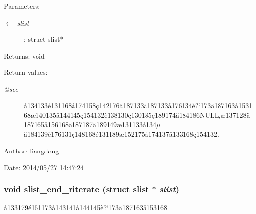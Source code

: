 \begin{Desc}
\item[Parameters:]
\begin{description}
\item[\mbox{$\leftarrow$} {\em slist}]: struct slist$\ast$ \end{description}
\end{Desc}
\begin{Desc}
\item[Returns:]void \end{Desc}
\begin{Desc}
\item[Return values:]
\begin{description}
\item[{\em @see}]\aa{}134133\'{e}131168\aa{}174158\c{c}142176\"{a}187133\"{a}187133\aa{}176134\`{e}?`173\"{a}187163\aa{}153168\ae{}140135\aa{}144145\c{c}154132\`{e}138130\c{c}130185\c{c}189174\"{a}184186NULL,\ae{}137128\"{a}187165\aa{}156168\"{a}187187\"{a}189149\ae{}131133\aa{}134$\mu$\"{a}184139\`{e}176131\c{c}148168\'{e}131189\ae{}152175\aa{}174137\aa{}133168\c{c}154132. \end{description}
\end{Desc}
\begin{Desc}
\item[Author:]liangdong \end{Desc}
\begin{Desc}
\item[Date:]2014/05/27 14:47:24 \end{Desc}
\subsubsection{\setlength{\rightskip}{0pt plus 5cm}void slist\_\-end\_\-riterate (struct slist $\ast$ {\em slist})}\label{slist_8h_a15}


\aa{}133179\'{e}151173\aa{}143141\aa{}144145\`{e}?`173\"{a}187163\aa{}153168 

